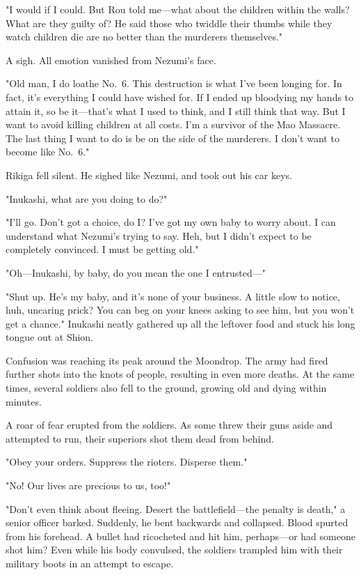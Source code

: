 "I would if I could. But Rou told me---what about the children within the
walls? What are they guilty of? He said those who twiddle their thumbs
while they watch children die are no better than the murderers
themselves."

A sigh. All emotion vanished from Nezumi's face.

"Old man, I do loathe No.~6. This destruction is what I've been longing
for. In fact, it's everything I could have wished for. If I ended up
bloodying my hands to attain it, so be it---that's what I used to think,
and I still think that way. But I want to avoid killing children at all
costs. I'm a survivor of the Mao Massacre. The last thing I want to do
is be on the side of the murderers. I don't want to become like No.~6."

Rikiga fell silent. He sighed like Nezumi, and took out his car keys.

"Inukashi, what are you doing to do?"

"I'll go. Don't got a choice, do I? I've got my own baby to worry about.
I can understand what Nezumi's trying to say. Heh, but I didn't expect
to be completely convinced. I must be getting old."

"Oh---Inukashi, by baby, do you mean the one I entrusted---"

"Shut up. He's my baby, and it's none of your business. A little slow to
notice, huh, uncaring prick? You can beg on your knees asking to see
him, but you won't get a chance." Inukashi neatly gathered up all the
leftover food and stuck his long tongue out at Shion.

\mybreak

Confusion was reaching its peak around the Moondrop. The army had fired
further shots into the knots of people, resulting in even more deaths.
At the same times, several soldiers also fell to the ground, growing old
and dying within minutes.

A roar of fear erupted from the soldiers. As some threw their guns aside
and attempted to run, their superiors shot them dead from behind.

"Obey your orders. Suppress the rioters. Disperse them."

"No! Our lives are precious to us, too!"

"Don't even think about fleeing. Desert the battlefield---the penalty is
death," a senior officer barked. Suddenly, he bent backwards and
collapsed. Blood spurted from his forehead. A bullet had ricocheted and
hit him, perhaps---or had someone shot him? Even while his body convulsed,
the soldiers trampled him with their military boots in an attempt to
escape.

